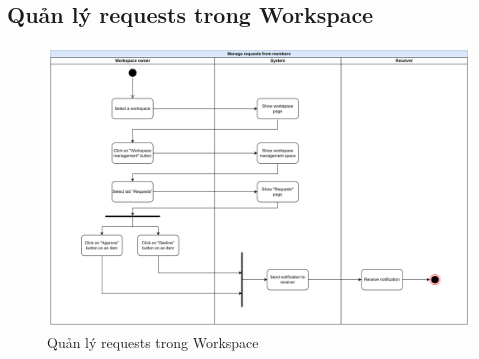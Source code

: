 \subsection{Quản lý requests trong Workspace}
    \begin{figure}[H]
        \centering
        \includegraphics[width=\linewidth]{Content/Phân tích và thiết kế hệ thống/documents/Sơ đồ hoạt động/images/manageRequests.png}
        \vspace{0.5cm}
        \caption{Quản lý requests trong Workspace}
        \label{fig:Quản lý requests trong Workspace}
    \end{figure}
